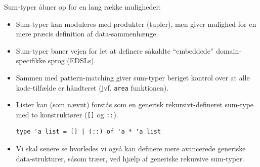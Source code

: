 \documentclass[rgb]{beamer}
\begin{document}
\begin{frame}[fragile]
\begin{footnotesize}

  \vspace{1ex}

  Sum-typer åbner op for en lang række muligheder:
  \vspace{1ex}
  \begin{itemize}
  \item Sum-typer kan moduleres med produkter (tupler), men giver
    mulighed for en mere præcis definition af data-sammenhænge.
  \vspace{1ex}
  \item Sum-typer baner vejen for let at definere såkaldte ``embeddede''
    domain-specifikke sprog (EDSLs).
  \vspace{1ex}
  \item Sammen med pattern-matching giver sum-typer beriget kontrol
    over at alle kode-tilfælde er håndteret (jvf. \lstinline{area} funktionen).
  \end{itemize}

  \vspace{1ex}

  \begin{itemize}
  \item Lister kan (som nævnt) forstås som en generisk rekursivt-defineret sum-type med to konstruktører (\lstinline{[]} og \lstinline{::}).
\begin{lstlisting}[numbers=none,frame=none,mathescape]
  type 'a list = [] | (::) of 'a * 'a list
\end{lstlisting}
  \item Vi skal senere se hvorledes vi også kan definere mere avancerede generiske data-strukturer, såsom træer, ved hjælp af generiske rekursive sum-typer.
  \end{itemize}

\end{footnotesize}
\end{frame}
\end{document}
